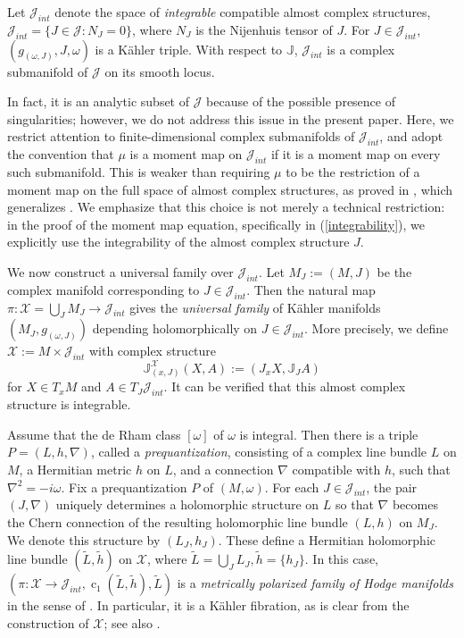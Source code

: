 \documentclass[12pt,reqno,a4paper]{amsart}
\numberwithin{equation}{section}
\DeclareMathOperator{\cc}{c}
\theoremstyle{definition}
\theoremstyle{remark}
\begin{document}
Let $\mathcal{J}_{int}$ denote the space of \textit{integrable} compatible almost complex structures, $\mathcal{J}_{int}=\{J\in\mathcal{J}: N_J=0\}$, where $N_J$ is the Nijenhuis tensor of $J$. For $J\in\mathcal{J}_{int}$, $(g_{(\omega,J)},J,\omega)$ is a K\"ahler triple. With respect to $\mathbb{J}$, $\mathcal{J}_{int}$ is a complex submanifold of $\mathcal{J}$ on its smooth locus. 

In fact, it is an analytic subset of $\mathcal{J}$ because of the possible presence of singularities; however, we do not address this issue in the present paper. Here, we restrict attention to finite-dimensional complex submanifolds of $\mathcal{J}_{int}$, and adopt the convention that $\mu$ is a moment map on $\mathcal{J}_{int}$ if it is a moment map on every such submanifold. This is weaker than requiring $\mu$ to be the restriction of a moment map on the full space of almost complex structures, as proved in \cite{dervan2023universal}, which generalizes \cite{donaldson1997remarks}. We emphasize that this choice is not merely a technical restriction: in the proof of the moment map equation, specifically in (\ref{integrability}), we explicitly use the integrability of the almost complex structure $J$.

We now construct a universal family over $\mathcal{J}_{int}$. Let $M_J:=(M,J)$ be the complex manifold corresponding to $J\in\mathcal{J}_{int}$. Then the natural map $\pi : \mathcal{X} = \bigcup_J M_J \rightarrow \mathcal{J}_{int}$ gives the \textit{universal family} of K\"ahler manifolds $(M_J,g_{(\omega,J)})$ depending holomorphically on $J\in\mathcal{J}_{int}$. More precisely, we define $\mathcal{X}:=M\times\mathcal{J}_{int}$ with complex structure
\begin{equation*}
\mathbb{J}^{\mathcal{X}}_{(x,J)}(X,A):=(J_x X,\mathbb{J}_J A)
\end{equation*}
for $X\in T_x M$ and $A\in T_J \mathcal{J}_{int}$. It can be verified that this almost complex structure is integrable.
 
Assume that the de Rham class $[\omega]$ of $\omega$ is integral. Then there is a triple $P=(L,h,\nabla)$, called a \textit{prequantization}, consisting of a complex line bundle $L$ on $M$, a Hermitian metric $h$ on $L$, and a connection $\nabla$ compatible with $h$, such that $\nabla^2=-i\omega$. Fix a prequantization $P$ of $(M,\omega)$. For each $J\in\mathcal{J}_{int}$, the pair $(J,\nabla)$ uniquely determines a holomorphic structure on $L$ so that $\nabla$ becomes the Chern connection of the resulting holomorphic line bundle $(L,h)$ on $M_J$. We denote this structure by $(L_J,h_J)$. These define a Hermitian holomorphic line bundle $(\widetilde{L},\widetilde{h})$ on $\mathcal{X}$, where $\widetilde{L}=\bigcup_J L_J, \widetilde{h}=\{h_J\}$. In this case, $(\pi:\mathcal{X}\rightarrow \mathcal{J}_{int}, \cc_1(\widetilde{L},\widetilde{h}), \widetilde{L})$ is a \textit{metrically polarized family of Hodge manifolds} in the sense of \cite[Definition 3.8]{fujiki1990moduli}. In particular, it is a K\"ahler fibration, as is clear from the construction of $\mathcal{X}$; see also \cite[Remark 3.4]{fujiki1990moduli}.
\end{document}
